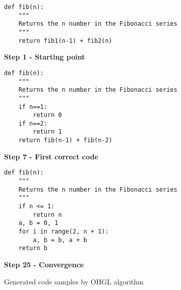 \begin{figure}[h]
\centering
\begin{minipage}{0.32\textwidth}
    \centering
    \begin{lstlisting}
def fib(n):
    """
    Returns the n number in the Fibonacci series
    """
    return fib1(n-1) + fib2(n)
    \end{lstlisting}
    \textbf{Step 1 - Starting point}
\end{minipage}
\hfill
\begin{minipage}{0.32\textwidth}
    \centering
    \begin{lstlisting}
def fib(n):
    """
    Returns the n number in the Fibonacci series
    """
    if n==1:
        return 0
    if n==2:
        return 1
    return fib(n-1) + fib(n-2)        
    \end{lstlisting}
    \textbf{Step 7 - First correct code}
\end{minipage}
\hfill
\begin{minipage}{0.32\textwidth}
    \centering
    \begin{lstlisting}
def fib(n):
    """
    Returns the n number in the Fibonacci series
    """
    if n <= 1:
        return n
    a, b = 0, 1
    for i in range(2, n + 1):
        a, b = b, a + b
    return b
    \end{lstlisting}
    \textbf{Step 25 - Convergence}
\end{minipage}

\caption{Generated code samples by OHGL algorithm}
\end{figure}

